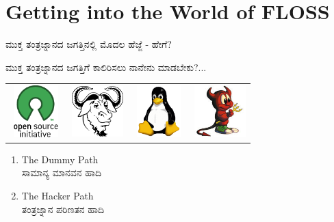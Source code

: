 \documentclass[slidestop,compress,brown]{beamer}
\newcommand\en[1]{{\english #1}}
\begin{document}
\section{\en{Getting into the World of FLOSS}}
\begin{frame}{ಮುಕ್ತ ತಂತ್ರಜ್ನಾನದ ಜಗತ್ತಿನಲ್ಲಿ ಮೊದಲ ಹೆಜ್ಜೆ - ಹೇಗೆ?}
  \begin{block}{}
    ಮುಕ್ತ ತಂತ್ರಜ್ನಾನದ ಜಗತ್ತಿಗೆ ಕಾಲಿರಿಸಲು ನಾನೇನು ಮಾಡಬೇಕು?...\linebreak[2]
  \end{block}
  \begin{center}
    \begin{tabular}{l c c r}
      \includegraphics[width=2cm,height=2cm,keepaspectratio]{OSI-logo} &
      \includegraphics[width=2cm,height=2cm,keepaspectratio]{gnu} &
      \includegraphics[width=2cm,height=2cm,keepaspectratio]{tux} &
      \includegraphics[width=2cm,height=2cm,keepaspectratio]{beastie}
    \end{tabular}
  \end{center}
  \begin{enumerate}
  \item <+-| alert@+> \en{The Dummy Path}\\
    ಸಾಮಾನ್ಯ ಮಾನವನ ಹಾದಿ\\
  \item<+-| alert@+> \en{The Hacker Path} \\
    ತಂತ್ರಜ್ನಾನ ಪರಿಣತನ ಹಾದಿ\\
  \end{enumerate}
\end{frame}
\end{document}
